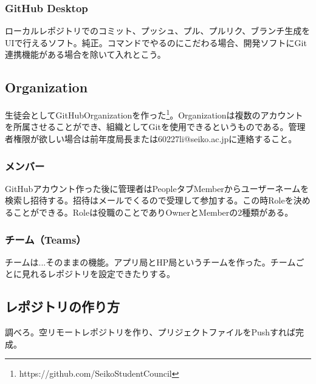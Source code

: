 \documentclass[dvipdfmx,jb5]{jreport}
\begin{document}
\subsubsection{GitHub Desktop}
ローカルレポジトリでのコミット、プッシュ、プル、プルリク、ブランチ生成をUIで行えるソフト。純正。コマンドでやるのにこだわる場合、開発ソフトにGit連携機能がある場合を除いて入れとこう。
\subsection{Organization}
生徒会としてGitHubOrganizationを作った\footnote{https://github.com/SeikoStudentCouncil}。Organizationは複数のアカウントを所属させることができ、組織としてGitを使用できるというものである。管理者権限が欲しい場合は前年度局長または60227li@seiko.ac.jpに連絡すること。
\subsubsection{メンバー}
GitHubアカウント作った後に管理者はPeopleタブ\>Memberからユーザーネームを検索し招待する。招待はメールでくるので受理して参加する。この時Roleを決めることができる。Roleは役職のことでありOwnerとMemberの2種類がある。
\subsubsection{チーム（Teams）}
チームは...そのままの機能。アプリ局とHP局というチームを作った。チームごとに見れるレポジトリを設定できたりする。
\subsection{レポジトリの作り方}
調べろ。空リモートレポジトリを作り、プリジェクトファイルをPushすれば完成。
\end{document}
